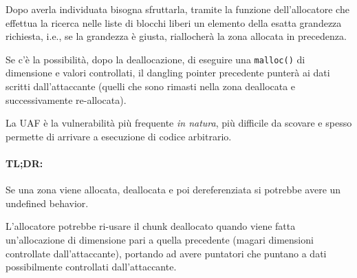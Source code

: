 Dopo averla individuata bisogna sfruttarla, tramite la funzione dell'allocatore che effettua la ricerca nelle liste di blocchi liberi un elemento della esatta grandezza richiesta, i.e., se la grandezza è giusta, riallocherà la zona allocata in precedenza.

Se c'è la possibilità, dopo la deallocazione, di eseguire una \texttt{malloc()} di dimensione e valori controllati, il dangling pointer precedente punterà ai dati scritti dall'attaccante (quelli che sono rimasti nella zona deallocata e successivamente re-allocata). 

La UAF è la vulnerabilità più frequente \textit{in natura}, più difficile da scovare e spesso permette di arrivare a esecuzione di codice arbitrario.

\vfill

\paragraph{TL;DR:} Se una zona viene allocata, deallocata e poi dereferenziata si potrebbe avere un undefined behavior.

L'allocatore potrebbe ri-usare il chunk deallocato quando viene fatta un'allocazione di dimensione pari a quella precedente (magari dimensioni controllate dall'attaccante), portando ad avere puntatori che puntano a dati possibilmente controllati dall'attaccante.

